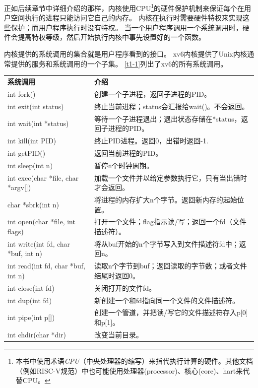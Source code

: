 正如后续章节中详细介绍的那样，内核使用CPU\footnote{本书中使用术语\emph{CPU}（中央处理器的缩写）来指代执行计算的硬件。其他文档（例如RISC-V规范）中也可能使用处理器(processor)、核心(core)、hart来代替CPU。}的硬件保护机制来保证每个在用户空间执行的进程只能访问它自己的内存。
内核在执行时需要硬件特权来实现这些保护；而用户程序执行时没有特权。
当一个用户程序调用一个系统调用时，硬件会提高特权等级，然后开始执行内核中事先设置好的一个函数。

内核提供的系统调用的集合就是用户程序看到的接口。
xv6内核提供了Unix内核通常提供的服务和系统调用的一个子集。
\autoref{t1-1}列出了xv6的所有系统调用。

\begin{table}[htbp]
    \centering
    \begin{tabular}{ll}
        \textbf{系统调用}   & \textbf{介绍} \\
        int fork()  & 创建一个子进程，返回子进程的PID。\\
        int exit(int status)    & 终止当前进程；status会汇报给wait()。不会返回。\\
        int wait(int *status)   & 等待一个子进程退出；退出状态存储在*status，返回子进程的PID。 \\
        int kill(int PID)   & 终止PID进程。返回0，出错时返回-1.\\
        int getPID()    & 返回当前进程的PID。         \\
        int sleep(int n)    & 暂停\texttt{n}个时钟周期。  \\
        int exec(char *file, char *argv[])  & 加载一个文件并以给定参数执行它，只有当出错时才会返回。  \\
        char *sbrk(int n) & 将进程的内存扩大n个字节。返回新内存的起始位置。   \\
        int open(char *file, int flags) & 打开一个文件；flag指示读/写；返回一个fd（文件描述符）。 \\
        int write(int fd, char *buf, int n)   & 将从buf开始的n个字节写入到文件描述符fd中；返回n。 \\
        int read(int fd, char *buf, int n)    & 读取n个字节到buf；返回读取的字节数；或者文件结尾时返回0。 \\
        int close(int fd)   & 关闭打开的文件fd。  \\
        int dup(int fd)     & 新创建一个和fd指向同一个文件的文件描述符。    \\
        int pipe(int p[])     & 创建一个管道，并把读/写它的文件描述符存入p[0]和p[1]。 \\
        int chdir(char *dir)  & 改变当前目录。  \\

\end{tabular}
\end{table}
